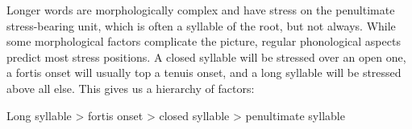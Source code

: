Longer words are morphologically complex and have stress on the penultimate stress-bearing unit, which is often a syllable of the root, but not always. While some morphological factors complicate the picture, regular phonological aspects predict most stress positions. A closed syllable will be stressed over an open one, a fortis onset will usually top a tenuis onset, and a long syllable will be stressed above all else. This gives us a hierarchy of factors:

\ea Long syllable > fortis onset > closed syllable > penultimate syllable
\z
	
%			
%		
%	


